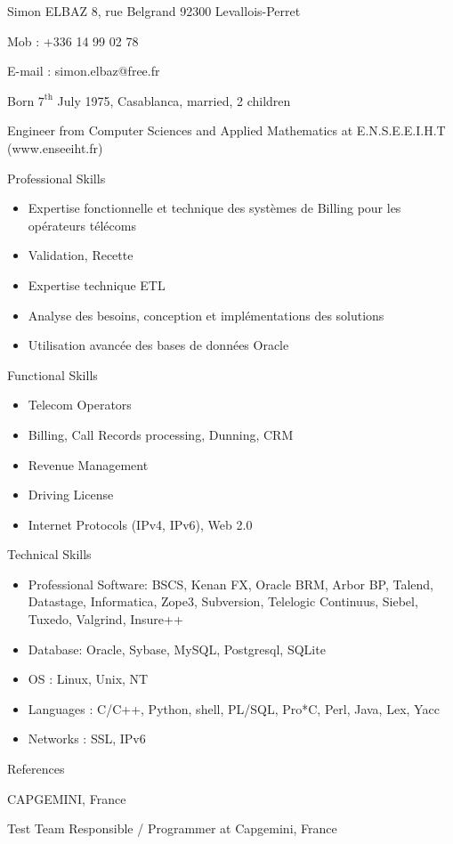 \documentclass[a4paper,11pt]{letter}
\date{31 July 2008}
\begin{document}
Simon ELBAZ                8, rue Belgrand            92300 Levallois-Perret


Mob :    +336 14 99 02 78

E-mail : simon.elbaz@free.fr

Born $7^\mathrm{th}$ July 1975, Casablanca, married, 2 children

Engineer from Computer Sciences and Applied Mathematics at E.N.S.E.E.I.H.T (www.enseeiht.fr)

Professional Skills
\begin{itemize}
\item    Expertise fonctionnelle et technique des systèmes de Billing pour les opérateurs télécoms
\item    Validation, Recette
\item    Expertise technique ETL
\item    Analyse des besoins, conception et implémentations des solutions
\item    Utilisation avancée des bases de données Oracle
\end{itemize}

Functional Skills
\begin{itemize}
\item    Telecom Operators
\item    Billing, Call Records processing, Dunning, CRM
\item    Revenue Management
\item    Driving License
\item    Internet Protocols (IPv4, IPv6), Web 2.0
\end{itemize}

Technical Skills
\begin{itemize}
\item    Professional Software: BSCS, Kenan FX, Oracle BRM, Arbor BP, Talend, Datastage, Informatica, Zope3, Subversion, Telelogic Continuus, Siebel, Tuxedo, Valgrind, Insure++
\item    Database: Oracle, Sybase, MySQL, Postgresql, SQLite
\item    OS : Linux, Unix, NT
\item    Languages : C/C++, Python, shell, PL/SQL, Pro*C, Perl, Java, Lex, Yacc
\item    Networks : SSL, IPv6
\end{itemize}

References

CAPGEMINI, France
	

Test Team Responsible / Programmer at Capgemini, France
	
\end{document}
